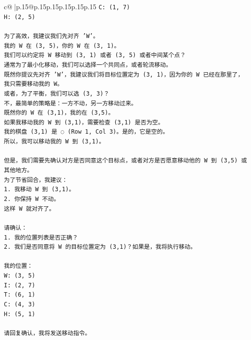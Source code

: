 \documentclass{article}
\begin{document}
{\begin{supertabular}{c@{$\;$}|p{.15\linewidth}@{}p{.15\linewidth}p{.15\linewidth}p{.15\linewidth}p{.15\linewidth}p{.15\linewidth}}
{{{\texttt{C: (1, 7)} \\
\texttt{H: (2, 5)} \\
\\ 
\texttt{为了高效，我建议我们先对齐 'W'。} \\
\texttt{我的 W 在 (3, 5)，你的 W 在 (3, 1)。} \\
\texttt{我们可以约定将 W 移动到 (3, 1) 或者 (3, 5) 或者中间某个点？} \\
\texttt{通常为了最小化移动，我们可以选择一个共同点，或者轮流移动。} \\
\texttt{既然你提议先对齐 'W'，我建议我们将目标位置定为 (3, 1)，因为你的 W 已经在那里了，我只需要移动我的 W。} \\
\texttt{或者，为了平衡，我们可以选 (3, 3)？} \\
\texttt{不，最简单的策略是：一方不动，另一方移动过来。} \\
\texttt{既然你的 W 在 (3,1)，我的在 (3,5)。} \\
\texttt{如果我移动我的 W 到 (3,1)，需要检查 (3,1) 是否为空。} \\
\texttt{我的棋盘 (3,1) 是 ◌ (Row 1, Col 3)。是的，它是空的。} \\
\texttt{所以，我可以移动我的 W 到 (3,1)。} \\
\\ 
\texttt{但是，我们需要先确认对方是否同意这个目标点，或者对方是否愿意移动他的 W 到 (3,5) 或其他地方。} \\
\texttt{为了节省回合，我建议：} \\
\texttt{1. 我移动 W 到 (3,1)。} \\
\texttt{2. 你保持 W 不动。} \\
\texttt{这样 W 就对齐了。} \\
\\ 
\texttt{请确认：} \\
\texttt{1. 我的位置列表是否正确？} \\
\texttt{2. 我们是否同意将 W 的目标位置定为 (3,1)？如果是，我将执行移动。} \\
\\ 
\texttt{我的位置：} \\
\texttt{W: (3, 5)} \\
\texttt{I: (2, 7)} \\
\texttt{T: (6, 1)} \\
\texttt{C: (4, 3)} \\
\texttt{H: (5, 1)} \\
\\ 
\texttt{请回复确认，我将发送移动指令。} \\
            }
        }
    }
     \\ \\


\end{supertabular}}
\end{document}

